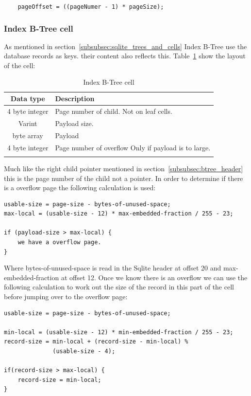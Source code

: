 \begin{lstlisting}	
	pageOffset = ((pageNumer - 1) * pageSize);
\end{lstlisting}

\subsubsection{Index B-Tree cell}
\label{subsubsec:index_btree_cell}

As mentioned in section~\ref{subsubsec:sqlite_trees_and_cells} Index B-Tree use the database records as keys. their content also reflects this. Table~\ref{tbl:index_btree_cell} show the layout of the cell:

\begin{longtable}[h]{| c | p{5cm} |}
		\hline
			\textbf{Data type} & \textbf{Description} \\ 
		\hline
		\endhead
			4 byte integer & Page number of child. \newline 
							 Not on leaf cells.\\
		\hline
			Varint & Payload size. \\
		\hline
			byte array & Payload \\
		\hline
			4 byte integer & Page number of overflow \newline
							  Only if payload is to large.\\
		\hline
	\caption{Index B-Tree cell}
	\label{tbl:index_btree_cell}
\end{longtable}

Much like the right child pointer mentioned in section~\ref{subsubsec:btree_header} this is the page number of the child not a pointer. In order to determine if there is a overflow page the following calculation is used:

\begin{lstlisting}	
usable-size = page-size - bytes-of-unused-space;
max-local = (usable-size - 12) * max-embedded-fraction / 255 - 23;

if (payload-size > max-local) {
	we have a overflow page.
}
\end{lstlisting}

Where bytes-of-unused-space is read in the Sqlite header at offset 20 and \newline max-embedded-fraction at offset 12. Once we know there is an overflow we can use the following calculation to work out the size of the record in this part of the cell before jumping over to the overflow page:  

\begin{lstlisting}	
usable-size = page-size - bytes-of-unused-space;

min-local = (usable-size - 12) * min-embedded-fraction / 255 - 23;
record-size = min-local + (record-size - min-local) % 
			  (usable-size - 4);

if(record-size > max-local) {
	record-size = min-local;
}
\end{lstlisting}

